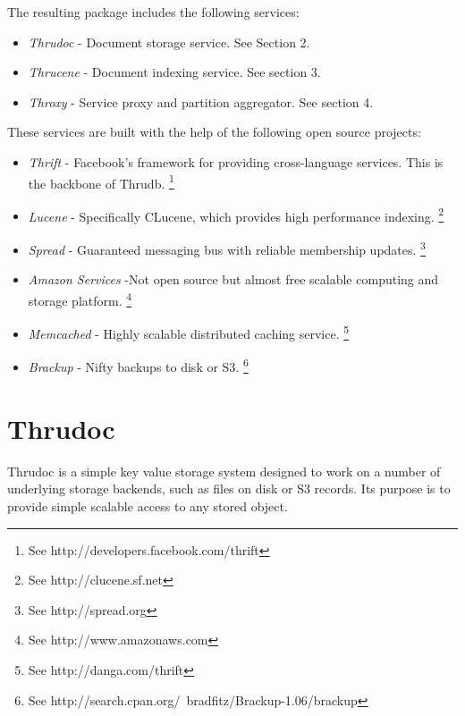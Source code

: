 \documentclass[nocopyrightspace,blockstyle]{sigplanconf}
\begin{document}
The resulting package includes the following services:

\begin{itemize}
\item\textit{Thrudoc}   - Document storage service. See Section 2.

\item\textit{Thrucene}  - Document indexing service. See section 3.

\item\textit{Throxy}    - Service proxy and partition aggregator. See section 4.
\end{itemize}

These services are built with the help of the following open source projects:
\begin{itemize}
\item\textit{Thrift}    - Facebook's framework for providing cross-language services.  This is the backbone of Thrudb. \footnote{See http://developers.facebook.com/thrift}

\item\textit{Lucene}    - Specifically CLucene, which provides high performance indexing. \footnote{See http://clucene.sf.net}

\item\textit{Spread}    - Guaranteed messaging bus with reliable membership updates. \footnote{See http://spread.org}

\item\textit{Amazon Services} -Not open source but almost free scalable computing and storage platform. \footnote{See http://www.amazonaws.com}

\item\textit{Memcached} - Highly scalable distributed caching service. \footnote{See http://danga.com/thrift}

\item\textit{Brackup}   - Nifty backups to disk or S3. \footnote{See http://search.cpan.org/~bradfitz/Brackup-1.06/brackup}
\end{itemize}

\section{Thrudoc}

Thrudoc is a simple key value storage system designed to work on a number of underlying storage backends, such as files on disk or S3 records.
Its purpose is to provide simple scalable access to any stored object.
\end{document}

